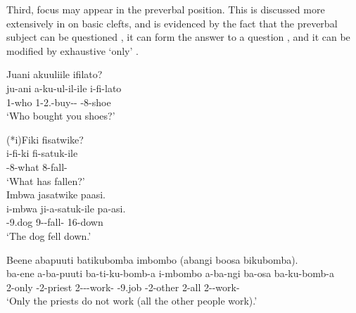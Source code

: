 \documentclass[output=paper]{langscibook}
\begin{document}
Third, focus may appear in the preverbal position. This is discussed more extensively in  on basic clefts, and is evidenced by the fact that the preverbal subject can be questioned , it can form the answer to a question , and it can be modified by exhaustive ‘only’ .

\ea
\label{bkm:Ref90303243}
Juani akuuliile ifilato?\\
\gll
ju-ani  a-ku-ul-il-ile  i-fi-lato\\
1-who  1\SM{}-2\SG{}.\OM{}-buy-\APPL{}-\PFV{}  \AUG{}-8-shoe\\
\glt
‘Who bought you shoes?’\\

\z


\ea
\label{bkm:Ref90303382}
\ea
(*i)Fiki fisatwike?\\
\gll
i-fi-ki  fi-satuk-ile\\
\AUG{}-8-what  8\SM{}-fall-\PFV{}\\
\glt
‘What has fallen?’\\

\ex
{Imbwa} {jasatwike} {paasi.}\\
\gll
{i-mbwa}  {ji-a-satuk-ile}  {pa-asi.}\\
{\AUG{}-9.dog}  {9\SM-\PST{}-fall-\FV{}}  {16-down}\\
\glt
‘The dog fell down.’ \citep[11]{KerrEtAl2023}\\

\z
\z

\ea
\label{bkm:Ref105352219}
Beene abapuuti batikubomba imbombo (abangi boosa bikubomba).\\
\gll
{ba-ene}  {a-ba-puuti}  {ba-ti-ku-bomb-a}  i-mbombo  a-ba-ngi ba-osa  ba-ku-bomb-a \\
2-only  {\AUG{}-2-priest}  {2\SM-\NEG-\PRS{}-work-\FV{}}  {\AUG{}-9.job}  {\AUG{}-2-other} 2-all  2\SM-\PRS{}-work-\FV{} \\
\glt
‘Only the priests do not work (all the other people work).’ \citep[11]{KerrEtAl2023}\\

\z
\end{document}
